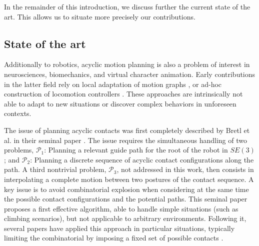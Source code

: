 In the remainder of this introduction, we discuss further the current state of the art. This allows us to situate more precisely our contributions.

\subsection{State of the art}

\newcommand{\Pa}{$\mathcal{P}_1$ }
\newcommand{\Pb}{$\mathcal{P}_2$ }

Additionally to robotics, acyclic motion planning is also a problem of interest in neurosciences, biomechanics, and virtual character animation.
Early contributions in the latter field rely on local adaptation of motion graphs \citep{citeulike:220163}, or ad-hoc construction of locomotion controllers \citep{Pettre:2003:LPD:846276.846313}. These approaches are intrinsically not able to adapt to new situations or discover complex behaviors in unforeseen contexts.

The issue of planning acyclic contacts was first completely described by Bretl et al. in their seminal paper  \citep{Bretl:2006:MPM:1124573.1124585}. The issue requires the simultaneous handling of two problems, $\mathcal{P}_1$: Planning a relevant guide path for the root of the robot in $SE(3)$; and $\mathcal{P}_2$: Planning a discrete sequence of acyclic contact configurations along the path. A third nontrivial problem, $\mathcal{P}_3$, not addressed in this work, then consists in interpolating a complete motion between two postures of the contact sequence.  A key issue is to avoid combinatorial explosion when considering at the same time the possible contact configurations and the potential paths. This seminal paper proposes a first effective algorithm, able to handle simple situations (such as climbing scenarios), but not applicable to arbitrary environments. Following it, seve\-ral papers have applied this approach in particular situations, typically limiting the combinatorial by imposing a fixed set of possible contacts \citep{Hauser06usingmotion, stilman2010}.

